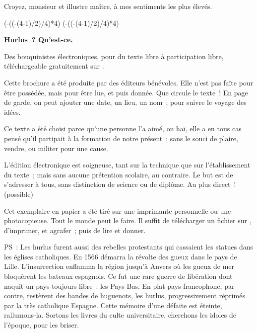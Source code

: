 \documentclass[french,twoside]{book} %
\def\truncdiv#1#2{((#1-(#2-1)/2)/#2)}
\def\moduloop#1#2{(#1-\truncdiv{#1}{#2}*#2)}
\def\modulo#1#2{\number\numexpr\moduloop{#1}{#2}\relax}
\begin{document}
Croyez, monsieur et illustre maître, à mes sentiments les plus élevés.
 


\ifbooklet
  \pagestyle{empty}
  \clearpage
  \ifnum\modulo{\value{page}}{4}=0 \hbox{}\newpage\hbox{}\newpage\fi
  \ifnum\modulo{\value{page}}{4}=1 \hbox{}\newpage\hbox{}\newpage\fi


  \hbox{}\newpage
  \ifodd\value{page}\hbox{}\newpage\fi
  {\centering\color{rubric}\bfseries\noindent\large
    Hurlus ? Qu’est-ce.\par
    \bigskip
  }
  \noindent Des bouquinistes électroniques, pour du texte libre à participation libre,
  téléchargeable gratuitement sur \href{https://hurlus.fr}{}.\par
  \bigskip
  \noindent Cette brochure a été produite par des éditeurs bénévoles.
  Elle n’est pas faîte pour être possédée, mais pour être lue, et puis donnée.
  Que circule le texte !
  En page de garde, on peut ajouter une date, un lieu, un nom ; pour suivre le voyage des idées.
  \par

  Ce texte a été choisi parce qu’une personne l’a aimé,
  ou haï, elle a en tous cas pensé qu’il partipait à la formation de notre présent ;
  sans le souci de plaire, vendre, ou militer pour une cause.
  \par

  L’édition électronique est soigneuse, tant sur la technique
  que sur l’établissement du texte ; mais sans aucune prétention scolaire, au contraire.
  Le but est de s’adresser à tous, sans distinction de science ou de diplôme.
  Au plus direct ! (possible)
  \par

  Cet exemplaire en papier a été tiré sur une imprimante personnelle
   ou une photocopieuse. Tout le monde peut le faire.
  Il suffit de
  télécharger un fichier sur \href{https://hurlus.fr}{},
  d’imprimer, et agrafer ; puis de lire et donner.\par

  \bigskip

  \noindent PS : Les hurlus furent aussi des rebelles protestants qui cassaient les statues dans les églises catholiques. En 1566 démarra la révolte des gueux dans le pays de Lille. L’insurrection enflamma la région jusqu’à Anvers où les gueux de mer bloquèrent les bateaux espagnols.
  Ce fut une rare guerre de libération dont naquit un pays toujours libre : les Pays-Bas.
  En plat pays francophone, par contre, restèrent des bandes de huguenots, les hurlus, progressivement réprimés par la très catholique Espagne.
  Cette mémoire d’une défaite est éteinte, rallumons-la. Sortons les livres du culte universitaire, cherchons les idoles de l’époque, pour les briser.
\fi
\end{document}
